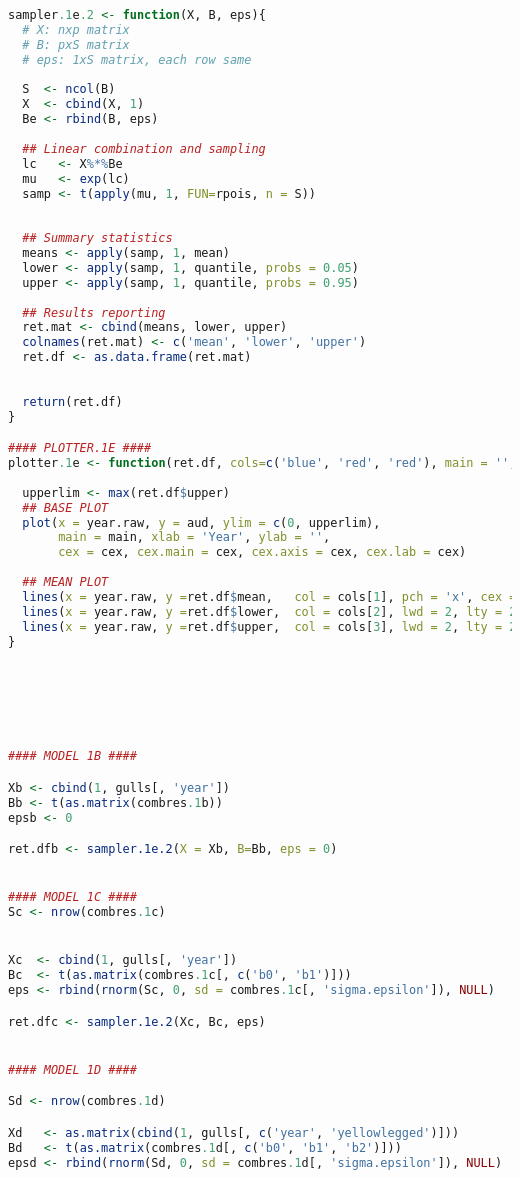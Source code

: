\documentclass[11pt]{article}
\begin{document}
\begin{lstlisting}[language=R]
sampler.1e.2 <- function(X, B, eps){
  # X: nxp matrix
  # B: pxS matrix
  # eps: 1xS matrix, each row same
  
  S  <- ncol(B)
  X  <- cbind(X, 1)
  Be <- rbind(B, eps)
  
  ## Linear combination and sampling
  lc   <- X%*%Be
  mu   <- exp(lc)
  samp <- t(apply(mu, 1, FUN=rpois, n = S))
  
  
  ## Summary statistics
  means <- apply(samp, 1, mean)
  lower <- apply(samp, 1, quantile, probs = 0.05)
  upper <- apply(samp, 1, quantile, probs = 0.95)
  
  ## Results reporting
  ret.mat <- cbind(means, lower, upper)
  colnames(ret.mat) <- c('mean', 'lower', 'upper')
  ret.df <- as.data.frame(ret.mat)
  
  
  return(ret.df)
}

#### PLOTTER.1E ####
plotter.1e <- function(ret.df, cols=c('blue', 'red', 'red'), main = '', cex = 1){
  
  upperlim <- max(ret.df$upper)
  ## BASE PLOT
  plot(x = year.raw, y = aud, ylim = c(0, upperlim), 
       main = main, xlab = 'Year', ylab = '',
       cex = cex, cex.main = cex, cex.axis = cex, cex.lab = cex)
  
  ## MEAN PLOT
  lines(x = year.raw, y =ret.df$mean,   col = cols[1], pch = 'x', cex = cex)
  lines(x = year.raw, y =ret.df$lower,  col = cols[2], lwd = 2, lty = 2)
  lines(x = year.raw, y =ret.df$upper,  col = cols[3], lwd = 2, lty = 2)
}






#### MODEL 1B ####

Xb <- cbind(1, gulls[, 'year'])
Bb <- t(as.matrix(combres.1b))
epsb <- 0

ret.dfb <- sampler.1e.2(X = Xb, B=Bb, eps = 0)


#### MODEL 1C ####
Sc <- nrow(combres.1c)


Xc  <- cbind(1, gulls[, 'year'])
Bc  <- t(as.matrix(combres.1c[, c('b0', 'b1')]))
eps <- rbind(rnorm(Sc, 0, sd = combres.1c[, 'sigma.epsilon']), NULL)

ret.dfc <- sampler.1e.2(Xc, Bc, eps)  


#### MODEL 1D ####

Sd <- nrow(combres.1d)

Xd   <- as.matrix(cbind(1, gulls[, c('year', 'yellowlegged')]))
Bd   <- t(as.matrix(combres.1d[, c('b0', 'b1', 'b2')]))
epsd <- rbind(rnorm(Sd, 0, sd = combres.1d[, 'sigma.epsilon']), NULL)


\end{lstlisting}
\end{document}
